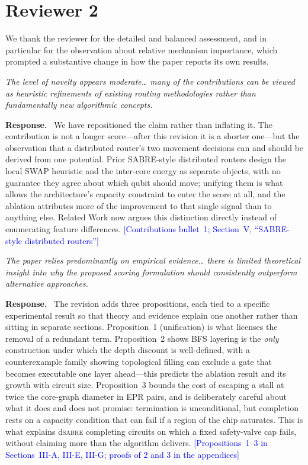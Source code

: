 \documentclass[11pt]{article}
\newcommand{\dSABRE}{d\textsc{sabre}}
\newenvironment{comment}{\medskip\noindent\itshape}{\par}
\newcommand{\response}{\smallskip\noindent\textbf{Response.}\ }
\newcommand{\where}[1]{\textcolor{blue}{[#1]}}
\begin{document}
\section*{Reviewer 2}

We thank the reviewer for the detailed and balanced assessment, and in
particular for the observation about relative mechanism importance,
which prompted a substantive change in how the paper reports its own
results.

\begin{comment}
The level of novelty appears moderate\ldots{} many of the contributions
can be viewed as heuristic refinements of existing routing
methodologies rather than fundamentally new algorithmic concepts.
\end{comment}

\response
We have repositioned the claim rather than inflating it.  The
contribution is not a longer score---after this revision it is a
shorter one---but the observation that a distributed router's two
movement decisions can and should be derived from one potential.  Prior
SABRE-style distributed routers design the local SWAP heuristic and the
inter-core energy as separate objects, with no guarantee they agree
about which qubit should move; unifying them is what allows the
architecture's capacity constraint to enter the score at all, and the
ablation attributes more of the improvement to that single signal than
to anything else.  Related Work now argues this distinction directly
instead of enumerating feature differences.
\where{Contributions bullet~1; Section~V, ``SABRE-style distributed
routers''}

\begin{comment}
The paper relies predominantly on empirical evidence\ldots{} there is
limited theoretical insight into why the proposed scoring formulation
should consistently outperform alternative approaches.
\end{comment}

\response
The revision adds three propositions, each tied to a specific
experimental result so that theory and evidence explain one another
rather than sitting in separate sections.  Proposition~1 (unification)
is what licenses the removal of a redundant term.  Proposition~2 shows
BFS layering is the \emph{only} construction under which the depth
discount is well-defined, with a counterexample family showing
topological filling can exclude a gate that becomes executable one layer
ahead---this predicts the ablation result and its growth with circuit
size.  Proposition~3 bounds the cost of escaping a stall at twice the
core-graph diameter in EPR pairs, and is deliberately careful about
what it does and does not promise: termination is unconditional, but
completion rests on a capacity condition that can fail if a region of
the chip saturates.  This is what explains \dSABRE{} completing
circuits on which a fixed safety-valve cap fails, without claiming more
than the algorithm delivers.
\where{Propositions~1--3 in Sections~III-A, III-E, III-G; proofs of 2 and 3 in the appendices}
\end{document}
